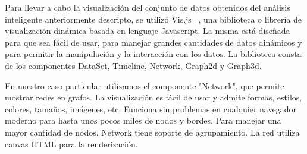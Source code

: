 
Para llevar a cabo la visualización del conjunto de datos obtenidos del análisis inteligente anteriormente descripto, se utilizó Vis.js ~\cite{ref_visjs}, una biblioteca o librería de visualización dinámica basada en lenguaje Javascript. La misma está diseñada para que sea fácil de usar, para manejar grandes cantidades de datos dinámicos y para permitir la manipulación y la interacción con los datos. La biblioteca consta de los componentes DataSet, Timeline, Network, Graph2d y Graph3d.

En nuestro caso particular utilizamos el componente "Network", que permite mostrar redes en grafos. La visualización es fácil de usar y admite formas, estilos, colores, tamaños, imágenes, etc. Funciona sin problemas en cualquier navegador moderno para hasta unos pocos miles de nodos y bordes. Para manejar una mayor cantidad de nodos, Network tiene soporte de agrupamiento. La red utiliza canvas HTML para la renderización.